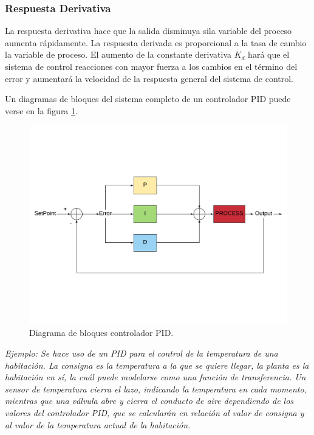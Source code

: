 \subsubsection{Respuesta Derivativa}
La respuesta derivativa hace que la salida disminuya sila variable del proceso aumenta rápidamente. La respuesta derivada es proporcional a la tasa de cambio la variable de proceso. El aumento de la constante derivativa $K_{d}$ hará que el sistema de control reacciones con mayor fuerza a los cambios en el término del error y aumentará la velocidad de la respuesta general del sistema de control. 

Un diagramas de bloques del sistema completo de un controlador PID puede verse en la figura \ref{fig:PID}.

\begin{center}
	\begin{figure}[H]
		\center
		\includegraphics[trim = 0mm 4cm 0mm 4cm,clip, angle=0, scale = 0.5]{imagenes/EstadoArte/PID}
		\caption{Diagrama de bloques controlador PID.}
		\label{fig:PID}
	\end{figure}
\end{center}

\textit{Ejemplo\label{ejemplo:1}: Se hace uso de un PID para el control de la temperatura de una habitación. La consigna es la temperatura a la que se quiere llegar, la planta es la habitación en sí, la cuál puede modelarse como una función de transferencia. Un sensor de temperatura cierra el lazo, indicando la temperatura en cada momento, mientras que una válvula abre y cierra el conducto de aire dependiendo de los valores del controlador PID, que se calcularán en relación al valor de consigna y al valor de la temperatura actual de la habitación.}










